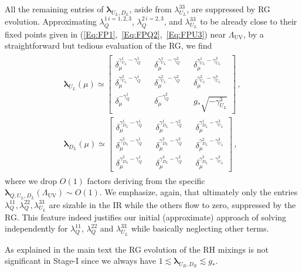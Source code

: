 \documentclass[aps,prl,twocolumn,showpacs,10pt,preprintnumbers,nofootinbib]{revtex4-2}
\newcommand{\gst}{g_*}
\begin{document}
{All the remaining entries of $\boldsymbol{\lambda}_{U_L,D_L}$, aside from $\lambda_{U_L}^{33}$, are suppressed by RG evolution. Approximating $\lambda_Q^{1\,i=1,2,3}$, $\lambda_Q^{2\,i=2,3}$, and $\lambda_{U_L}^{33}$ to be already close to their fixed points given in (\ref{Eq:FP1},~\ref{Eq:FPQ2},~\ref{Eq:FPU3}) near $\Lambda_{\text{UV}}$, by a straightforward but tedious evaluation of the RG, we find 
\begin{align}
\begin{aligned}\label{Eq:LHEndStageI}
    \boldsymbol{\lambda}_{U_L}(\mu)\simeq \begin{bmatrix}
        \delta_{\mu}^{\gamma_{U_L}^1-\gamma_Q^1}&&\delta_{\mu}^{\gamma_{U_L}^1-\gamma_Q^2} && \delta_{\mu}^{\gamma_{U_L}^1-\gamma_{U_L}^3}\\
        \delta_{\mu}^{\gamma_{U_L}^2-\gamma_Q^1}&&\delta_{\mu}^{\gamma_{U_L}^2-\gamma_Q^2} && \delta_{\mu}^{\gamma_{U_L}^2-\gamma_{U_L}^3}\\
        \delta_{\mu}^{-\gamma_Q^1}&&\delta_{\mu}^{-\gamma_Q^2} && \gst \sqrt{-\gamma_{U_L}^3}
    \end{bmatrix}\,,\\
    \boldsymbol{\lambda}_{D_L}(\mu)\simeq \begin{bmatrix}
        \delta_{\mu}^{\gamma_{D_L}^1-\gamma_Q^1}&&\delta_{\mu}^{\gamma_{D_L}^1-\gamma_Q^2} && \delta_{\mu}^{\gamma_{D_L}^1-\gamma_{U_L}^3}\\
        \delta_{\mu}^{\gamma_{D_L}^2-\gamma_Q^1}&&\delta_{\mu}^{\gamma_{D_L}^2-\gamma_Q^2} && \delta_{\mu}^{\gamma_{D_L}^2-\gamma_{U_L}^3}\\
        \delta_{\mu}^{\gamma_{D_L}^3-\gamma_Q^1}&&\delta_{\mu}^{\gamma_{D_L}^3-\gamma_Q^2} && \delta_{\mu}^{\gamma_{D_L}^3-\gamma_{U_L}^3}
    \end{bmatrix}\,,
    \end{aligned}
\end{align}
where we drop $O(1)$ factors deriving from the specific $\boldsymbol{\lambda}_{Q,U_L,D_L}(\Lambda_{\text{UV}})\sim O(1)$. 
%
We emphasize, again, that ultimately only the entries $\lambda_Q^{11},\lambda_Q^{22},\lambda_{U_L}^{33}$ are sizable in the IR while the others flow to zero, suppressed by the RG. 
This feature indeed justifies our initial (approximate) approach of solving independently for $\lambda_{Q}^{11}$, $\lambda_{Q}^{22}$ and $\lambda_{U_L}^{33}$ while basically neglecting other terms.

As explained in the main text the RG evolution of the RH mixings is not significant in Stage-I since we always have $1\lesssim\boldsymbol{\lambda}_{U_R,D_R}\lesssim\gst$.

}
\end{document}
